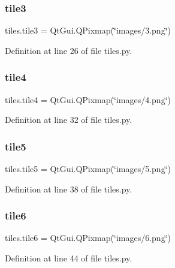 \subsubsection{\texorpdfstring{tile3}{tile3}}
{\footnotesize\ttfamily tiles.\+tile3 = Qt\+Gui.\+Q\+Pixmap(\char`\"{}images/3.png\char`\"{})}



Definition at line 26 of file tiles.\+py.

\mbox{\label{namespacetiles_a583600e0c2ef7fdf4804b2f7789a6505}} 
\subsubsection{\texorpdfstring{tile4}{tile4}}
{\footnotesize\ttfamily tiles.\+tile4 = Qt\+Gui.\+Q\+Pixmap(\char`\"{}images/4.png\char`\"{})}



Definition at line 32 of file tiles.\+py.

\mbox{\label{namespacetiles_a84e293464dc8b4d59eefa6a172f376b9}} 
\subsubsection{\texorpdfstring{tile5}{tile5}}
{\footnotesize\ttfamily tiles.\+tile5 = Qt\+Gui.\+Q\+Pixmap(\char`\"{}images/5.png\char`\"{})}



Definition at line 38 of file tiles.\+py.

\mbox{\label{namespacetiles_a858e46b259ee31fe6811a43bc1725fde}} 
\subsubsection{\texorpdfstring{tile6}{tile6}}
{\footnotesize\ttfamily tiles.\+tile6 = Qt\+Gui.\+Q\+Pixmap(\char`\"{}images/6.png\char`\"{})}



Definition at line 44 of file tiles.\+py.

\mbox{\label{namespacetiles_a815b3f0652af21c014efc7c388ad764e}} 
